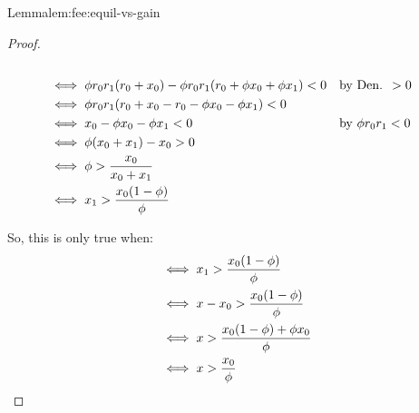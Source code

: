 \begin{proofof}{Lemma}{lem:fee:equil-vs-gain}
\begin{itemize}
\begin{proof}
\begin{align*}
                    \\
                    & \iff
                        \fee \ammR[0] \ammR[1] (\ammR[0] + x_0) - \fee \ammR[0] \ammR[1] (\ammR[0] + \fee x_0 + \fee x_1) < 0  && \text{by Den. } > 0
                    \\
                    & \iff
                        \fee \ammR[0] \ammR[1] (\ammR[0] + x_0 - \ammR[0] - \fee x_0 - \fee x_1) < 0
                    \\
                    & \iff
                        x_0 - \fee x_0 - \fee x_1 < 0    && \text{by } \fee \ammR[0] \ammR[1] < 0
                    \\
                    & \iff
                        \fee (x_0 + x_1) - x_0 > 0
                    \\
                    & \iff
                        \fee > \frac{x_0}{x_0 + x_1}
                    \\
                    & \iff
                    x_1 > \frac{x_0(1 - \fee)}{\fee}
                \end{align*}

                So, this is only true when: 
                \begin{align*}
                    & \iff
                    x_1 > \frac{x_0(1 - \fee)}{\fee}
                    \\
                    & \iff
                    x - x_0 > \frac{x_0(1 - \fee)}{\fee}
                    \\
                    & \iff
                    x > \frac{x_0(1 - \fee) + \fee x_0}{\fee}
                    \\
                    & \iff
                    x > \frac{x_0}{\fee}
                \end{align*}
            \end{proof}
    \end{itemize}
\end{proofof}


